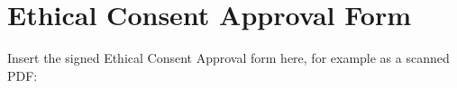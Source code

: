 \chapter{Ethical Consent Approval Form}
\label{app:ethics}

Insert the signed Ethical Consent Approval form here, for example as a scanned PDF:

